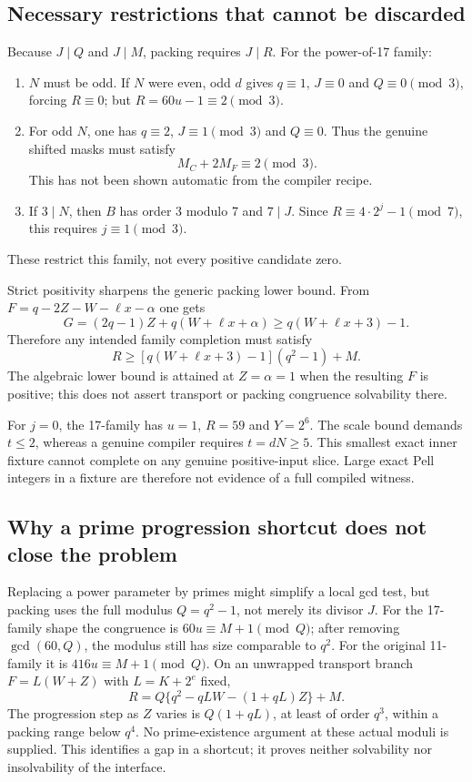 \documentclass[11pt,letterpaper]{article}
\theoremstyle{definition}\newtheorem{definition}[theorem]{Definition}
\theoremstyle{remark}\newtheorem{remark}[theorem]{Remark}
\begin{document}
\subsection{Necessary restrictions that cannot be discarded}
Because $J\mid Q$ and $J\mid M$, packing requires $J\mid R$.
For the power-of-17 family:
\begin{enumerate}
\item $N$ must be odd. If $N$ were even, odd $d$ gives $q\equiv1$,
$J\equiv0$ and $Q\equiv0\pmod3$, forcing $R\equiv0$; but
$R=60u-1\equiv2\pmod3$.
\item For odd $N$, one has $q\equiv2$, $J\equiv1\pmod3$ and $Q\equiv0$.
Thus the genuine shifted masks must satisfy
\begin{equation}
 M_C+2M_F\equiv2\pmod3.\label{fup:fc:eq:maskcondition}
\end{equation}
This has not been shown automatic from the compiler recipe.
\item If $3\mid N$, then $B$ has order 3 modulo 7 and $7\mid J$.
Since $R\equiv4\cdot2^j-1\pmod7$, this requires $j\equiv1\pmod3$.
\end{enumerate}
These restrict this family, not every positive candidate zero.

Strict positivity sharpens the generic packing lower bound. From
$F=q-2Z-W-\ell x-\alpha$ one gets
\[
 G=(2q-1)Z+q(W+\ell x+\alpha)
 \ge q(W+\ell x+3)-1.
\]
Therefore any intended family completion must satisfy
\begin{equation}
 R\ge [q(W+\ell x+3)-1](q^2-1)+M.\label{fup:fc:eq:sharpbound}
\end{equation}
The algebraic lower bound is attained at $Z=\alpha=1$ when the resulting
$F$ is positive; this does not assert transport or packing congruence
solvability there.

For $j=0$, the 17-family has $u=1$, $R=59$ and $Y=2^6$.
The scale bound demands $t\le2$, whereas a genuine compiler requires
$t=dN\ge5$. This smallest exact inner fixture cannot complete on any
genuine positive-input slice. Large exact Pell integers in a fixture are
therefore not evidence of a full compiled witness.

\subsection{Why a prime progression shortcut does not close the problem}
Replacing a power parameter by primes might simplify a local gcd test,
but packing uses the full modulus $Q=q^2-1$, not merely its divisor $J$.
For the 17-family shape the congruence is $60u\equiv M+1\pmod Q$;
after removing $\gcd(60,Q)$, the modulus still has size comparable to
$q^2$. For the original 11-family it is $416u\equiv M+1\pmod Q$.
On an unwrapped transport branch $F=L(W+Z)$ with $L=K+2^e$ fixed,
\[
 R=Q\{q^2-qLW-(1+qL)Z\}+M.
\]
The progression step as $Z$ varies is $Q(1+qL)$, at least of order
$q^3$, within a packing range below $q^4$. No prime-existence argument
at these actual moduli is supplied. This identifies a gap in a shortcut;
it proves neither solvability nor insolvability of the interface.
\end{document}
